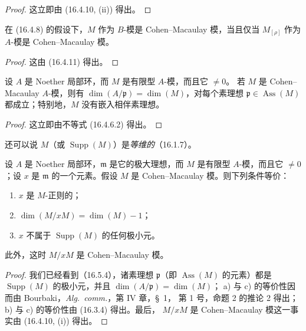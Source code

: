 \begin{proof}
这立即由 (16.4.10, (ii)) 得出。
\end{proof}

\begin{proposition}[16.5.3]
\label{0.16.5.3-fr}
在 (16.4.8) 的假设下，$M$ 作为 $B$-模是 Cohen--Macaulay 模，当且仅当
$M_{[\rho]}$ 作为 $A$-模是 Cohen--Macaulay 模。
\end{proposition}

\begin{proof}
这由 (16.4.11) 得出。
\end{proof}

\begin{proposition}[16.5.4]
\label{0.16.5.4-fr}
设 $A$ 是 Noether 局部环，而 $M$ 是有限型 $A$-模，而且它 $\neq0$。
若 $M$ 是 Cohen--Macaulay $A$-模，则有
$\dim(A/\mathfrak{p})=\dim(M)$，对每个素理想
$\mathfrak{p}\in\operatorname{Ass}(M)$ 都成立；特别地，$M$ 没有嵌入相伴素理想。
\end{proposition}

\begin{proof}
这立即由不等式 (16.4.6.2) 得出。
\end{proof}

还可以说 $M$（或 $\operatorname{Supp}(M)$）是\emph{等维的}（16.1.7）。


\begin{proposition}[16.5.5]
\label{0.16.5.5-fr}
设 $A$ 是 Noether 局部环，$\mathfrak{m}$ 是它的极大理想，而 $M$ 是有限型
$A$-模，而且它 $\neq0$；设 $x$ 是 $\mathfrak{m}$ 的一个元素。假设 $M$ 是
Cohen--Macaulay 模。则下列条件等价：
\begin{enumerate}
  \item[a)] $x$ 是 $M$-正则的；
  \item[b)] $\dim(M/xM)=\dim(M)-1$；
  \item[c)] $x$ 不属于 $\operatorname{Supp}(M)$ 的任何极小元。
\end{enumerate}
此外，这时 $M/xM$ 是 Cohen--Macaulay 模。
\end{proposition}

\begin{proof}
我们已经看到（16.5.4），诸素理想 $\mathfrak{p}$（即
$\operatorname{Ass}(M)$ 的元素）都是 $\operatorname{Supp}(M)$ 的极小元，并且
$\dim(A/\mathfrak{p})=\dim(M)$；
a) 与 c) 的等价性因而由 Bourbaki，\emph{Alg.~comm.}，第 IV 章，\S~1，
第 1 号，命题 2 的推论 2 得出；b) 与 c) 的等价性由 (16.3.4) 得出。最后，
$M/xM$ 是 Cohen--Macaulay 模这一事实由 (16.4.10, (i)) 得出。
\end{proof}

